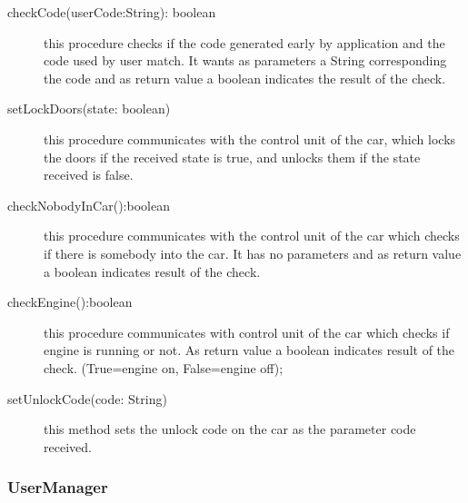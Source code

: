 \documentclass{scrreprt}
\begin{document}
\begin{description}
\item[checkCode(userCode:String): boolean] this procedure checks if the code generated early by application and the code used by user match. It wants as parameters  a String corresponding the code and as return value a boolean indicates the result of the check.

\item[setLockDoors(state: boolean)] this procedure communicates with the control unit of the car, which locks the doors if the received state is true, and unlocks them if the state received is false.

\item[checkNobodyInCar():boolean] this procedure communicates with the control unit of the car which checks if there is somebody into the car. It has no parameters and as return value a boolean indicates result of the check.
\item[checkEngine():boolean] this procedure communicates with control unit of the car which checks if engine is running or not. As return value a boolean indicates result of the check. (True=engine on, False=engine off);
\item[setUnlockCode(code: String)] this method sets the unlock code on the car as the parameter code received.
\end{description}

\subsubsection{UserManager}
\end{document}

